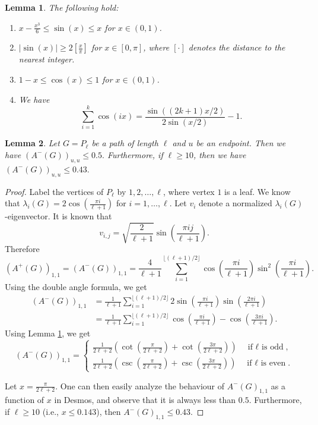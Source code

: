 \documentclass{article}
\newtheorem{lemma}{Lemma}[section]
\begin{document}
\begin{lemma}\label{lemma:sin_cos}
   The following hold:
    \begin{enumerate}[$(i)$]
        \item $x-\frac{x^3}6 \le \sin(x) \le x$ for $x\in (0,1)$.
        \item $|\sin(x)|\ge 2[\frac{x}{\pi}]$ for $x\in [0,\pi]$, where $[\cdot]$ denotes the distance to the nearest integer.
        \item $1-x\le \cos(x)\le 1$ for $x\in (0,1)$.
        \item We have 
        \[\sum_{i = 1}^k \cos(i x) = \frac{\sin((2k + 1) x / 2)}{2\sin(x / 2)} - 1.\]
    \end{enumerate}
\end{lemma}

\begin{lemma}\label{lem:path-endpoint}
Let $G = P_\ell$ be a path of length $\ell$ and $u$ be an endpoint. Then we have $(A^-(G))_{u, u} \leq 0.5.$ Furthermore, if $\ell \geq 10$, then we have $(A^-(G))_{u, u} \leq 0.43.$
\end{lemma}

\begin{proof}
Label the vertices of $P_{\ell}$ by $1, 2, \ldots, \ell$, where vertex $1$ is a leaf. We know that $\lambda_i(G) = 2 \cos \left(\frac{\pi i}{\ell + 1}\right)$ for $i = 1,\ldots, \ell$. Let $v_i$ denote a normalized $\lambda_i(G)$-eigenvector. It is known that 
\[v_{i, j} = \sqrt{\frac{2}{\ell + 1}} \sin\left(\frac{\pi ij}{\ell + 1}\right).\]
Therefore
    \[(A^+(G))_{1, 1} = (A^-(G))_{1, 1} = \frac{4}{\ell+1} \sum_{i = 1}^{\lfloor (\ell + 1) / 2 \rfloor}\cos \left(\frac{\pi i}{\ell + 1}\right) \sin^2 \left(\frac{\pi i}{\ell + 1}\right).\]
Using the double angle formula, we get
\begin{align*}
    (A^-(G))_{1, 1} &= \frac{1}{\ell+1}  \sum_{i = 1}^{\lfloor (\ell + 1) / 2 \rfloor}2\sin\left(\frac{\pi i}{\ell + 1}\right)  \sin \left(\frac{2\pi i}{\ell + 1}\right) \\
    &= \frac{1}{\ell+1}  \sum_{i = 1}^{\lfloor (\ell + 1) / 2 \rfloor}\cos \left(\frac{\pi i}{\ell + 1}\right)  - \cos \left(\frac{3\pi i}{\ell + 1}\right) .
\end{align*}
Using Lemma \ref{lemma:sin_cos}, we get 
\[(A^-(G))_{1, 1} =\begin{cases}
 \frac{1}{2\ell+2} \left(\cot \left(\frac{\pi}{2\ell + 2}\right) + \cot \left(\frac{3\pi}{2\ell + 2}\right)\right) \quad \text{if $\ell$ is odd}, \\
 \frac{1}{2\ell+2} \left(\csc \left(\frac{\pi}{2\ell + 2}\right) + \csc \left(\frac{3\pi}{2\ell + 2}\right)\right) \quad \text{if $\ell$ is even}. 
\end{cases}\]

Let $x=\frac{\pi}{2\ell +2}$. One can then easily analyze the behaviour of $A^-(G)_{1,1}$ as a function of $x$ in Desmos, and observe that it is always less than $0.5$. Furthermore, if $\ell\ge 10$ (i.e., $x\le 0.143$), then $A^-(G)_{1,1}\le 0.43$.\end{proof}
\end{document}
